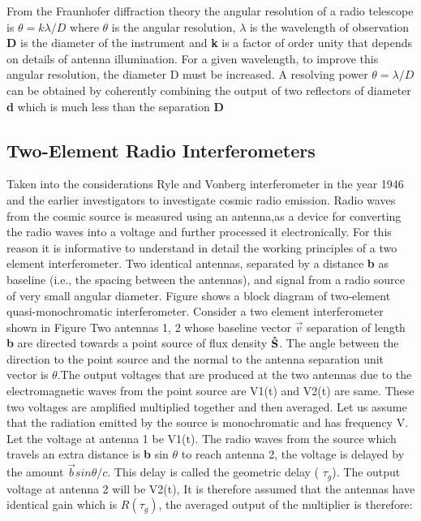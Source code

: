 {From the Fraunhofer diffraction theory %
the angular resolution of a radio telescope is \(\theta=k\lambda/D\) where \(\theta\) is the angular resolution, \(\lambda\) is the wavelength of observation \textbf{D} is the diameter of the instrument and
\textbf{k} is a factor of order unity that depends on details of antenna illumination. For a given wavelength, to improve this angular resolution, the diameter D must be increased. A resolving power \(\theta =\lambda/D\) can be obtained by coherently combining the output of two
reflectors of diameter \textbf{d} which is much less than the separation \textbf{D} %

\subsection{Two-Element Radio Interferometers}
Taken into the considerations Ryle and Vonberg interferometer in the year 1946 %
and the earlier investigators %
to investigate cosmic radio emission.
 Radio waves from the cosmic source is measured using an antenna,as a device for converting the radio waves into a voltage and further processed it electronically. For this reason it is informative to understand in detail the working principles of a two element interferometer.
Two identical antennas, separated by a distance \textbf{b} as baseline (i.e., the spacing between the antennas), and signal from a radio source of very small angular diameter. Figure %
shows a block diagram of two-element quasi-monochromatic interferometer.
Consider a two element interferometer shown in Figure  %
Two antennas 1, 2 whose baseline vector \(\vec{v}\) separation of length \textbf{b} are directed towards a point source of flux density {\(\bm\hat\textbf{{S}}\)}.
The angle between the direction to the point source and the normal to the antenna separation unit vector  is \textbf{\({\theta}\)}.The output voltages that are produced at the two antennas due to the electromagnetic waves from the point source are V1(t) and V2(t) are same. These two voltages are amplified multiplied together and then averaged. Let us assume that the radiation emitted by the source is
monochromatic and has frequency V. Let the voltage at antenna 1 be V1(t).
The radio waves from the source  which travels an extra distance is \textbf{b} sin \(\theta\) to reach antenna 2, the voltage is delayed by the amount \(\vec{b} sin \theta/c\). This delay is called the geometric delay ( \(\tau_g\)). The output voltage at antenna 2 will be V2(t),  It is therefore assumed that the antennas have identical gain which is \(R(\tau_g )\), the averaged output of the multiplier is therefore: \\



}
